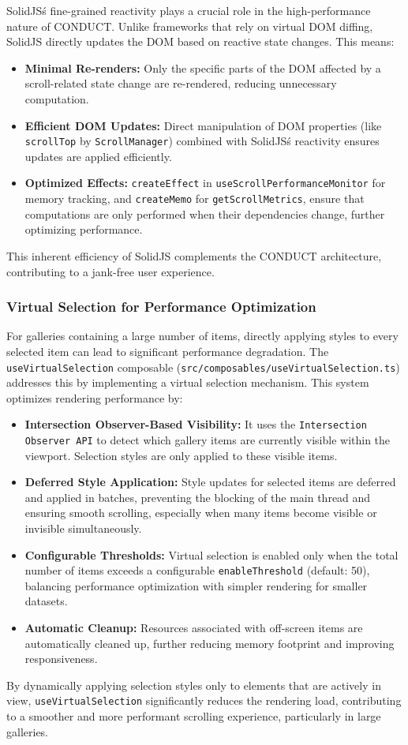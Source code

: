 \documentclass[10pt]{article}
\begin{document}
SolidJS\'s fine-grained reactivity plays a crucial role in the high-performance nature of CONDUCT. Unlike frameworks that rely on virtual DOM diffing, SolidJS directly updates the DOM based on reactive state changes. This means:
\begin{itemize}
    \item \textbf{Minimal Re-renders:} Only the specific parts of the DOM affected by a scroll-related state change are re-rendered, reducing unnecessary computation.
    \item \textbf{Efficient DOM Updates:} Direct manipulation of DOM properties (like \texttt{scrollTop} by \texttt{ScrollManager}) combined with SolidJS\'s reactivity ensures updates are applied efficiently.
    \item \textbf{Optimized Effects:} \texttt{createEffect} in \texttt{useScrollPerformanceMonitor} for memory tracking, and \texttt{createMemo} for \texttt{getScrollMetrics}, ensure that computations are only performed when their dependencies change, further optimizing performance.
\end{itemize}
This inherent efficiency of SolidJS complements the CONDUCT architecture, contributing to a jank-free user experience.

\subsubsection{Virtual Selection for Performance Optimization}

For galleries containing a large number of items, directly applying styles to every selected item can lead to significant performance degradation. The \texttt{useVirtualSelection} composable (\texttt{src/composables/useVirtualSelection.ts}) addresses this by implementing a virtual selection mechanism. This system optimizes rendering performance by:
\begin{itemize}
    \item \textbf{Intersection Observer-Based Visibility:} It uses the \texttt{Intersection Observer API} to detect which gallery items are currently visible within the viewport. Selection styles are only applied to these visible items.
    \item \textbf{Deferred Style Application:} Style updates for selected items are deferred and applied in batches, preventing the blocking of the main thread and ensuring smooth scrolling, especially when many items become visible or invisible simultaneously.
    \item \textbf{Configurable Thresholds:} Virtual selection is enabled only when the total number of items exceeds a configurable \texttt{enableThreshold} (default: 50), balancing performance optimization with simpler rendering for smaller datasets.
    \item \textbf{Automatic Cleanup:} Resources associated with off-screen items are automatically cleaned up, further reducing memory footprint and improving responsiveness.
\end{itemize}
By dynamically applying selection styles only to elements that are actively in view, \texttt{useVirtualSelection} significantly reduces the rendering load, contributing to a smoother and more performant scrolling experience, particularly in large galleries.
\end{document}
